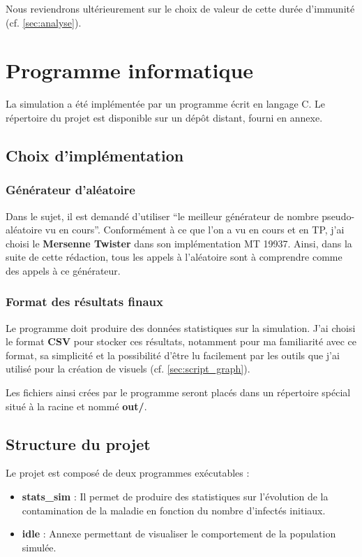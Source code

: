 \documentclass[12pt,french,titlepage]{article}
\begin{document}
Nous reviendrons ultérieurement sur le choix de valeur de cette durée d'immunité (cf. \ref{sec:analyse}).

\newpage



\section{Programme informatique}
La simulation a été implémentée par un programme écrit en langage C. Le répertoire du projet est disponible sur un dépôt distant, fourni en annexe.


\subsection{Choix d'implémentation}
\subsubsection{Générateur d'aléatoire}
Dans le sujet, il est demandé d'utiliser “le meilleur générateur de nombre pseudo-aléatoire vu en cours”. Conformément à ce que l'on a vu en cours et en TP, j'ai choisi le \textbf{Mersenne Twister} dans son implémentation MT 19937. Ainsi, dans la suite de cette rédaction, tous les appels à l'aléatoire sont à comprendre comme des appels à ce générateur.

\subsubsection{Format des résultats finaux}
Le programme doit produire des données statistiques sur la simulation. J'ai choisi le format \textbf{CSV} pour stocker ces résultats, notamment pour ma familiarité avec ce format, sa simplicité et la possibilité d'être lu facilement par les outils que j'ai utilisé pour la création de visuels (cf. \ref{sec:script_graph}).

Les fichiers ainsi crées par le programme seront placés dans un répertoire spécial situé à la racine et nommé \textbf{out/}.


\subsection{Structure du projet}


Le projet est composé de deux programmes exécutables :

\begin{itemize}
\item \textbf{stats\_sim} : Il permet de produire des statistiques sur l'évolution de la contamination de la maladie en fonction du nombre d'infectés initiaux.
\item \textbf{idle} : Annexe permettant de visualiser le comportement de la population simulée.\\
\end{itemize}
\end{document}
